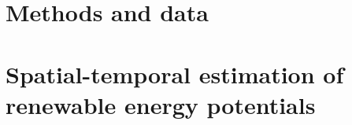 %
%
%






\setlength{\parindent}{0pt}
\setlength{\parskip}{0pt} %
\frontmatter

% 
\setcounter{page}{0}
% 
% 


\cleardoublepage
{}
\tableofcontents

\cleardoublepage
{}
{} %
\listoffigures
% 
\cleardoublepage
{}
{} %
\listoftables

\cleardoublepage
{}
{} %


\setlength{\parskip}{1em}


\nobibliography*
\mainmatter

\cleardoublepage

\part{Methods and data}
\label{methods}

\cleardoublepage

\cleardoublepage

\part{Spatial-temporal estimation of renewable energy potentials}
\label{potential}

\cleardoublepage

\cleardoublepage

